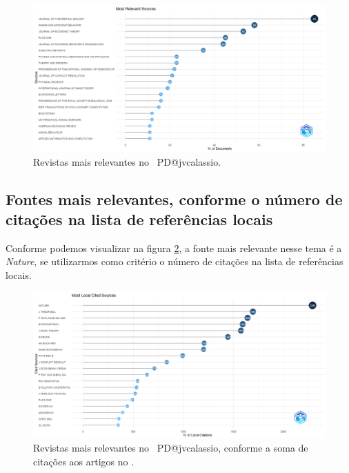 \begin{figure}
    \centering
    \includegraphics[width=1\textwidth]{exploratory-data-analysis/jvcalassio/PesqBibliogr/PrisonersDilemma/WoS-20221201/Dataset/MostRelevantSources-2022-12-03.png}
    \caption{Revistas mais relevantes no  \dataset\ PD@jvcalassio.}
    \label{fig:PD@jvcalassio:Most-Relevant-Sources}
\end{figure}

\subsection{Fontes mais relevantes, conforme o número de citações na lista de referências locais}

Conforme podemos visualizar na figura \ref{fig:PD@jvcalassio:Most-Local-Cited-Sources(from-Reference-Lists).png}, a fonte mais relevante nesse tema é a \textit{Nature}, se utilizarmos como critério o número de citações na lista de referências locais.

\begin{figure}
    \centering
    \includegraphics[width=1\textwidth]{exploratory-data-analysis/jvcalassio/PesqBibliogr/PrisonersDilemma/WoS-20221201/Dataset/MostLocalCitedSources-2022-12-03.png}
    \caption{Revistas mais relevantes no  \dataset\ PD@jvcalassio, conforme a soma de citações aos artigos no \dataset.}
    \label{fig:PD@jvcalassio:Most-Local-Cited-Sources(from-Reference-Lists).png}
\end{figure}

